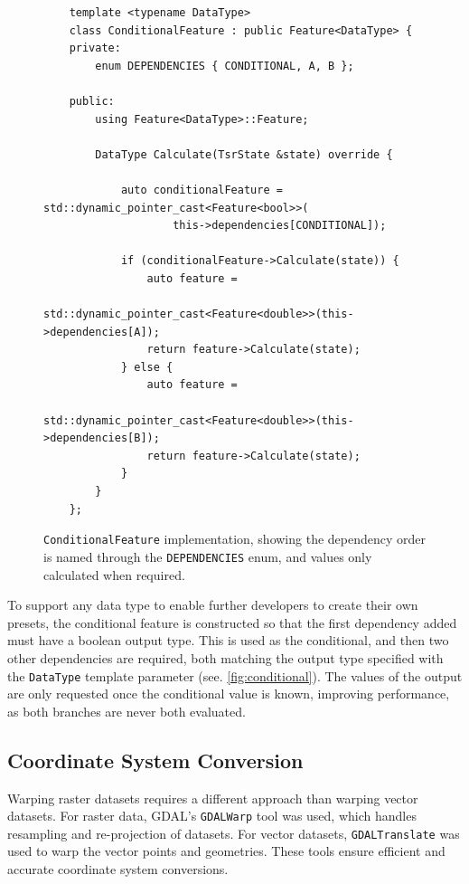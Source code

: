 \documentclass[12pt]{article}
\begin{document}
\begin{figure}[H]
  \centering
  \begin{lstlisting}
	template <typename DataType>
	class ConditionalFeature : public Feature<DataType> {
	private:
		enum DEPENDENCIES { CONDITIONAL, A, B };

	public:
		using Feature<DataType>::Feature;

		DataType Calculate(TsrState &state) override {

			auto conditionalFeature = std::dynamic_pointer_cast<Feature<bool>>(
					this->dependencies[CONDITIONAL]);

			if (conditionalFeature->Calculate(state)) {
				auto feature =
						std::dynamic_pointer_cast<Feature<double>>(this->dependencies[A]);
				return feature->Calculate(state);
			} else {
				auto feature =
						std::dynamic_pointer_cast<Feature<double>>(this->dependencies[B]);
				return feature->Calculate(state);
			}
		}
	};
	\end{lstlisting}
  \vspace{-2em}
  \caption{\texttt{ConditionalFeature} implementation, showing the dependency order is named through the \texttt{DEPENDENCIES} enum, and values only calculated when required.}
  \label{fig:conditional}
\end{figure}

To support any data type to enable further developers to create their own presets, the conditional feature is constructed so that the first dependency added must have a boolean output type. This is used as the conditional, and then two other dependencies are required, both matching the output type specified with the \texttt{DataType} template parameter (see. \autoref{fig:conditional}). The values of the output are only requested once the conditional value is known, improving performance, as both branches are never both evaluated.

\subsection{Coordinate System Conversion}

Warping raster datasets requires a different approach than warping vector datasets. For raster data, GDAL's \texttt{GDALWarp} tool was used, which handles resampling and re-projection of datasets. For vector datasets, \texttt{GDALTranslate} was used to warp the vector points and geometries. These tools ensure efficient and accurate coordinate system conversions.
\end{document}
